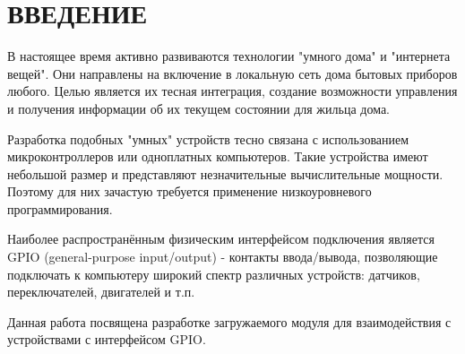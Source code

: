 \section*{ВВЕДЕНИЕ}

В настоящее время активно развиваются технологии "умного дома" и "интернета вещей". Они направлены на включение в локальную сеть дома бытовых приборов любого. Целью является их тесная интеграция, создание возможности управления и получения информации об их текущем состоянии для жильца дома. 

Разработка подобных "умных" устройств тесно связана с использованием микроконтроллеров или одноплатных компьютеров. Такие устройства имеют небольшой размер и представляют незначительные вычислительные мощности. Поэтому для них зачастую требуется применение низкоуровневого программирования. 

Наиболее распространённым физическим интерфейсом подключения является GPIO (general-purpose input/output) - контакты ввода/вывода, позволяющие подключать к компьютеру широкий спектр различных устройств: датчиков, переключателей, двигателей и т.п.

Данная работа посвящена разработке загружаемого модуля для взаимодействия с устройствами с интерфейсом GPIO. 

\pagebreak